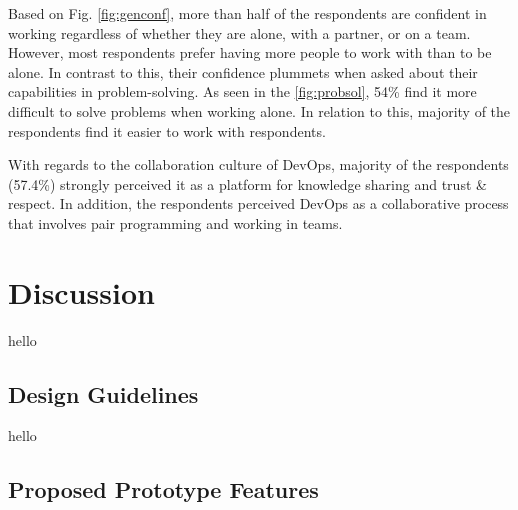 \documentclass{sigchi}
\begin{document}
Based on Fig. \ref{fig:genconf}, more than half of the respondents are confident in working regardless of whether they are alone, with a partner, or on a team. However, most respondents prefer having more people to work with than to be alone.  In contrast to this, their confidence plummets when asked about their capabilities in problem-solving. As seen in the \ref{fig:probsol}, 54\% find it more difficult to solve problems when working alone. In relation to this, majority of the respondents find it easier to work with respondents.

With regards to the collaboration culture of DevOps, majority of the respondents (57.4\%) strongly perceived it as a platform for knowledge sharing and trust & respect. In addition, the respondents perceived DevOps as a collaborative process that involves pair programming and working in teams.  



\section{Discussion}
hello
\subsection{Design Guidelines}
hello
\subsection{Proposed Prototype Features}
\end{document}
